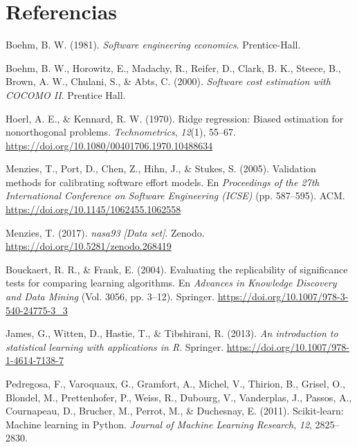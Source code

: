 \documentclass[11pt,a4paper]{article}
\begin{document}
\section*{Referencias}

\begingroup
{}
\begin{enumerate}[label={[\arabic*]},itemsep=2pt,leftmargin=1.8em]

\item\label{boehm1981software} Boehm, B. W. (1981).
  \textit{Software engineering economics}. Prentice-Hall.

\item\label{boehm2000cocomo} Boehm, B. W., Horowitz, E., Madachy, R., Reifer, D., Clark, B. K., Steece, B., Brown, A. W., Chulani, S., \& Abts, C. (2000).
  \textit{Software cost estimation with COCOMO II}. Prentice Hall.

\item\label{hoerl1970ridge} Hoerl, A. E., \& Kennard, R. W. (1970).
  Ridge regression: Biased estimation for nonorthogonal problems.
  \textit{Technometrics}, \textit{12}(1), 55--67.
  \url{https://doi.org/10.1080/00401706.1970.10488634}

\item\label{menzies2005validation} Menzies, T., Port, D., Chen, Z., Hihn, J., \& Stukes, S. (2005).
  Validation methods for calibrating software effort models.
  En \textit{Proceedings of the 27th International Conference on Software Engineering (ICSE)} (pp. 587--595). ACM.
  \url{https://doi.org/10.1145/1062455.1062558}

\item\label{zenodo268419} Menzies, T. (2017).
  \textit{nasa93 [Data set]}. Zenodo.
  \url{https://doi.org/10.5281/zenodo.268419}

\item\label{bouckaert2004evaluating} Bouckaert, R. R., \& Frank, E. (2004).
  Evaluating the replicability of significance tests for comparing learning algorithms.
  En \textit{Advances in Knowledge Discovery and Data Mining} (Vol. 3056, pp. 3--12). Springer.
  \url{https://doi.org/10.1007/978-3-540-24775-3_3}

\item\label{james2013introduction} James, G., Witten, D., Hastie, T., \& Tibshirani, R. (2013).
  \textit{An introduction to statistical learning with applications in R}. Springer.
  \url{https://doi.org/10.1007/978-1-4614-7138-7}

\item\label{pedregosa2011scikit} Pedregosa, F., Varoquaux, G., Gramfort, A., Michel, V., Thirion, B., Grisel, O., Blondel, M., Prettenhofer, P., Weiss, R., Dubourg, V., Vanderplas, J., Passos, A., Cournapeau, D., Brucher, M., Perrot, M., \& Duchesnay, E. (2011).
  Scikit-learn: Machine learning in Python.
  \textit{Journal of Machine Learning Research}, \textit{12}, 2825--2830.

\end{enumerate}
\endgroup
\end{document}

